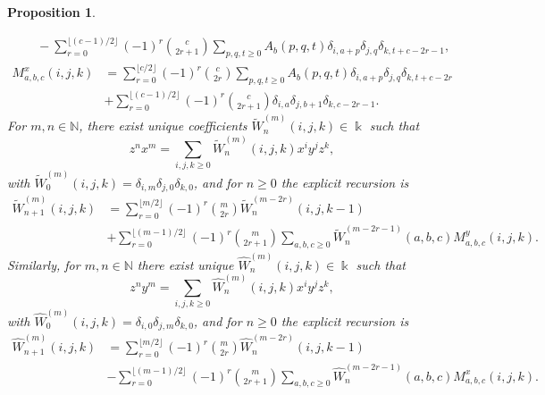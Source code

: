\documentclass{amsart}
\newtheorem{proposition}[theorem]{Proposition}
\theoremstyle{definition}
\theoremstyle{remark}
\numberwithin{equation}{section}
\begin{document}
\begin{proposition}
\begin{enumerate}
\begin{equation}
\begin{aligned}
&\quad-\sum_{r=0}^{\lfloor (c-1)/2\rfloor}(-1)^r\binom{c}{2r+1}
\sum_{p,q,t\ge 0}A_b(p,q,t)\delta_{i,a+p}\delta_{j,q}\delta_{k,t+c-2r-1},
\end{aligned}
\end{equation}
\begin{equation}\label{Mxkernelcase5i}
\begin{aligned}
M^{x}_{a,b,c}(i,j,k)
&=\sum_{r=0}^{\lfloor c/2\rfloor}(-1)^r\binom{c}{2r}
\sum_{p,q,t\ge 0}A_b(p,q,t)\delta_{i,a+p}\delta_{j,q}\delta_{k,t+c-2r}\\
&+\sum_{r=0}^{\lfloor (c-1)/2\rfloor}(-1)^r\binom{c}{2r+1}\delta_{i,a}\delta_{j,b+1}\delta_{k,c-2r-1}.
\end{aligned}
\end{equation}
For $m,n\in\mathbb N$, there exist unique coefficients $\widetilde W^{(m)}_{n}(i,j,k)\in\Bbbk$ such that
\begin{equation}\label{Wtildedefcase5i}
z^n x^m=\sum_{i,j,k\ge 0}\widetilde W^{(m)}_{n}(i,j,k) x^i y^j z^k,
\end{equation}
with $\widetilde W^{(m)}_{0}(i,j,k)=\delta_{i,m}\delta_{j,0}\delta_{k,0}$, and for $n\ge 0$ the explicit recursion is
\begin{equation}\label{Wtildereccase5i}
\begin{aligned}
\widetilde W^{(m)}_{n+1}(i,j,k) &=\sum_{r=0}^{\lfloor m/2\rfloor}(-1)^r\binom{m}{2r}\widetilde W^{(m-2r)}_{n}(i,j,k-1)\\
&+\sum_{r=0}^{\lfloor (m-1)/2\rfloor}(-1)^r\binom{m}{2r+1}
\sum_{a,b,c\ge 0}\widetilde W^{(m-2r-1)}_{n}(a,b,c)M^y_{a,b,c}(i,j,k).
\end{aligned}
\end{equation}
Similarly, for $m,n\in\mathbb N$ there exist unique $\widehat W^{(m)}_{n}(i,j,k)\in\Bbbk$ such that
\begin{equation}\label{Whatdefcase5i}
z^n y^m=\sum_{i,j,k\ge 0}\widehat W^{(m)}_{n}(i,j,k) x^i y^j z^k,
\end{equation}
with $\widehat W^{(m)}_{0}(i,j,k)=\delta_{i,0}\delta_{j,m}\delta_{k,0}$, and for $n\ge 0$ the explicit recursion is
\begin{equation}\label{Whatreccase5i}
\begin{aligned}
\widehat W^{(m)}_{n+1}(i,j,k) &=\sum_{r=0}^{\lfloor m/2\rfloor}(-1)^r\binom{m}{2r}\widehat W^{(m-2r)}_{n}(i,j,k-1)\\
&-\sum_{r=0}^{\lfloor (m-1)/2\rfloor}(-1)^r\binom{m}{2r+1}\sum_{a,b,c\ge 0}\widehat W^{(m-2r-1)}_{n}(a,b,c)M^x_{a,b,c}(i,j,k).
\end{aligned}
\end{equation}


\end{enumerate}
\end{proposition}
\end{document}
